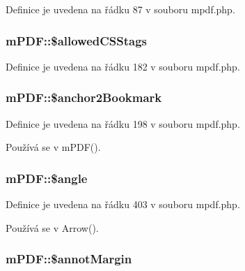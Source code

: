 Definice je uvedena na řádku 87 v souboru mpdf.\-php.

\hypertarget{classm_p_d_f_a88b39fc02010c197220d3136486f51fc}{
\subsubsection[{\$allowed\-C\-S\-Stags}]{\setlength{\rightskip}{0pt plus 5cm}m\-P\-D\-F\-::\$allowed\-C\-S\-Stags}}\label{classm_p_d_f_a88b39fc02010c197220d3136486f51fc}


Definice je uvedena na řádku 182 v souboru mpdf.\-php.

\hypertarget{classm_p_d_f_a446ef93bac1a003b22cd8a480733b8eb}{
\subsubsection[{\$anchor2\-Bookmark}]{\setlength{\rightskip}{0pt plus 5cm}m\-P\-D\-F\-::\$anchor2\-Bookmark}}\label{classm_p_d_f_a446ef93bac1a003b22cd8a480733b8eb}


Definice je uvedena na řádku 198 v souboru mpdf.\-php.



Používá se v m\-P\-D\-F().

\hypertarget{classm_p_d_f_a31b316849f1604f55b97f8b75d5dba09}{
\subsubsection[{\$angle}]{\setlength{\rightskip}{0pt plus 5cm}m\-P\-D\-F\-::\$angle}}\label{classm_p_d_f_a31b316849f1604f55b97f8b75d5dba09}


Definice je uvedena na řádku 403 v souboru mpdf.\-php.



Používá se v Arrow().

\hypertarget{classm_p_d_f_a77ad146999fbc0d7deb9e8909bed4b1c}{
\subsubsection[{\$annot\-Margin}]{\setlength{\rightskip}{0pt plus 5cm}m\-P\-D\-F\-::\$annot\-Margin}}\label{classm_p_d_f_a77ad146999fbc0d7deb9e8909bed4b1c}


